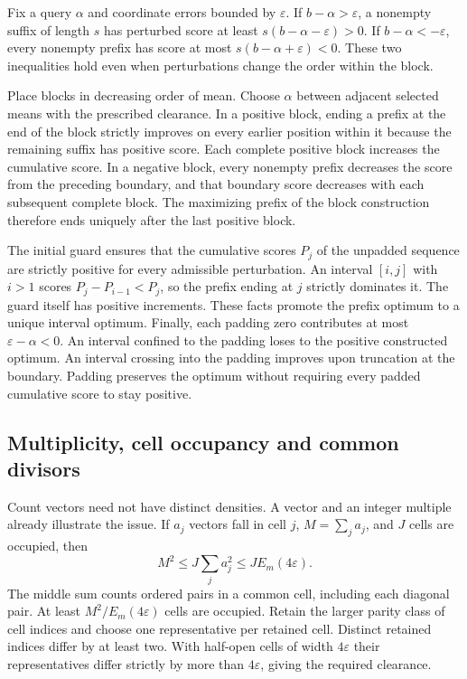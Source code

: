 Fix a query $\alpha$ and coordinate errors bounded by $\varepsilon$. If $b-\alpha>\varepsilon$, a nonempty suffix of length $s$ has perturbed score at least $s(b-\alpha-\varepsilon)>0$. If $b-\alpha<-\varepsilon$, every nonempty prefix has score at most $s(b-\alpha+\varepsilon)<0$. These two inequalities hold even when perturbations change the order within the block.

Place blocks in decreasing order of mean. Choose $\alpha$ between adjacent selected means with the prescribed clearance. In a positive block, ending a prefix at the end of the block strictly improves on every earlier position within it because the remaining suffix has positive score. Each complete positive block increases the cumulative score. In a negative block, every nonempty prefix decreases the score from the preceding boundary, and that boundary score decreases with each subsequent complete block. The maximizing prefix of the block construction therefore ends uniquely after the last positive block.

The initial guard ensures that the cumulative scores $P_j$ of the unpadded sequence are strictly positive for every admissible perturbation. An interval $[i,j]$ with $i>1$ scores $P_j-P_{i-1}<P_j$, so the prefix ending at $j$ strictly dominates it. The guard itself has positive increments. These facts promote the prefix optimum to a unique interval optimum. Finally, each padding zero contributes at most $\varepsilon-\alpha<0$. An interval confined to the padding loses to the positive constructed optimum. An interval crossing into the padding improves upon truncation at the boundary. Padding preserves the optimum without requiring every padded cumulative score to stay positive.

\subsection{Multiplicity, cell occupancy and common divisors}
Count vectors need not have distinct densities. A vector and an integer multiple already illustrate the issue. If $a_j$ vectors fall in cell $j$, $M=\sum_j a_j$, and $J$ cells are occupied, then
\[
 M^2\le J\sum_j a_j^2\le J E_m(4\varepsilon).
\]
The middle sum counts ordered pairs in a common cell, including each diagonal pair. At least $M^2/E_m(4\varepsilon)$ cells are occupied. Retain the larger parity class of cell indices and choose one representative per retained cell. Distinct retained indices differ by at least two. With half-open cells of width $4\varepsilon$ their representatives differ strictly by more than $4\varepsilon$, giving the required clearance.

